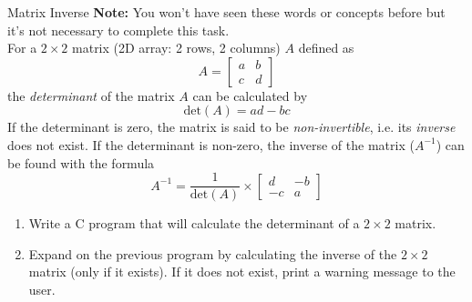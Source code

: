 \documentclass{pass}
\begin{document}
\begin{task}{Matrix Inverse}{}
\textbf{Note:} You won't have seen these words or concepts before but it's not necessary to complete this task.\\

For a $2\times2$ matrix (2D array: 2 rows, 2 columns) $A$ defined as
$$ A = \begin{bmatrix} a & b \\ c & d \end{bmatrix} $$
the \textit{determinant} of the matrix $A$ can be calculated by
$$ \text{det}(A) = ad-bc $$
If the determinant is zero, the matrix is said to be \textit{non-invertible}, i.e. its \textit{inverse} does not exist. If the determinant is non-zero, the inverse of the matrix ($A^{-1}$) can be found with the formula
$$ A^{-1} = \dfrac{1}{\text{det}(A)} \times \begin{bmatrix} d & -b \\ -c & a \end{bmatrix} $$
	\begin{enumerate}
	\item Write a C program that will calculate the determinant of a $2\times2$ matrix.\\
	\item Expand on the previous program by calculating the inverse of the $2\times2$ matrix (only if it exists). If it does not exist, print a warning message to the user.
	\end{enumerate}


\end{task}
\end{document}
